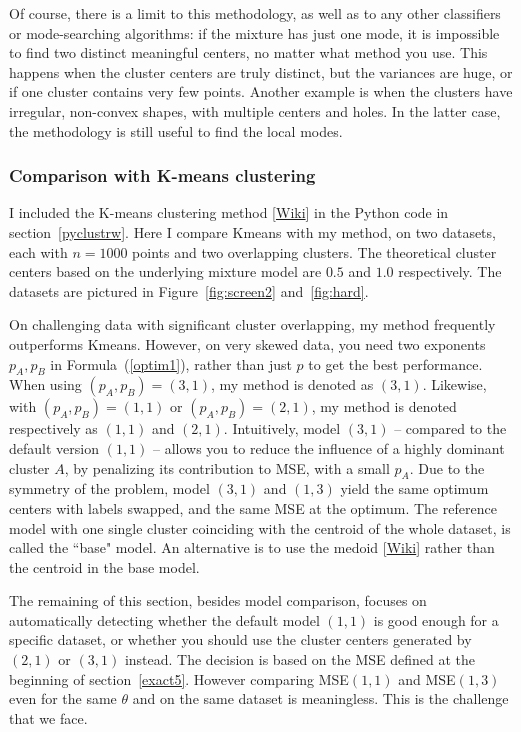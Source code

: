 \documentclass[oneside,10pt]{book}
\begin{document}
Of course, there is a limit to this methodology, as well as to any other classifiers or mode-searching algorithms: if the mixture
 has just one mode, it is impossible to find two distinct meaningful centers, no matter what method you use. This happens when the cluster centers are truly distinct, but the variances 
are huge, or if one cluster contains very few points. Another example is when the clusters have irregular, non-convex shapes, with multiple centers and holes. In the latter case,
 the methodology is still useful to find the local modes.

 \subsubsection{Comparison with K-means clustering}\label{kmeans}

I included the \textcolor{index}{K-means clustering} method [\href{https://en.wikipedia.org/wiki/K-means_clustering}{Wiki}] in the Python code in section~\ref{pyclustrw}. Here I compare Kmeans with my method, on two datasets, each 
 with $n=1000$ points and two overlapping clusters. The theoretical cluster centers based on the underlying mixture model are $0.5$ and $1.0$ respectively.  
The datasets are pictured in Figure~\ref{fig:screen2} and~\ref{fig:hard}.

On challenging data with significant cluster overlapping, my method frequently outperforms Kmeans. However, on very skewed data, you 
 need two exponents $p_A, p_B$ in Formula~(\ref{optim1}), rather than just $p$ to get the best performance. When using $(p_A, p_B)=(3,1)$, my method is denoted as $(3,1)$. Likewise, with $(p_A, p_B)=(1,1)$ or $(p_A, p_B)=(2,1)$, my method is denoted respectively as $(1, 1)$ and $(2,1)$.
Intuitively, model $(3, 1)$ -- compared to the default version $(1, 1)$ -- allows you to  reduce the influence of a highly dominant cluster $A$, by penalizing its contribution to MSE, with a small $p_A$. Due to the symmetry of the problem, model $(3, 1)$ and $(1, 3)$ yield the same optimum centers 
with labels swapped,
and the same MSE at the optimum.  
  The reference model with one 
 single cluster coinciding with the centroid of the whole dataset, is called the ``base" model. An alternative is to use 
the \textcolor{index}{medoid} [\href{https://en.wikipedia.org/wiki/Medoid}{Wiki}] rather than the centroid in the base model. 

The remaining of this section, besides model comparison, focuses on automatically detecting whether the default model $(1, 1)$ is good enough for a 
specific dataset,   or whether you should use the cluster centers generated by $(2,1)$ or $(3, 1)$ instead. The decision is based on 
 the MSE defined at the beginning of section~\ref{exact5}. However comparing MSE$(1,1)$  and
MSE$(1, 3)$ even for the same $\theta$ and on the same dataset is meaningless. This is the challenge that we face. 
\end{document}
